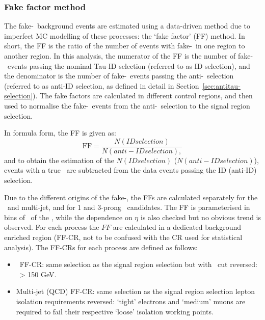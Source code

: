 \subsubsection{Fake factor method}
The fake-\tauhad\ background events
are estimated using a data-driven method due to imperfect MC modelling of these processes:
the `fake factor' (FF) method.
In short, the FF is the ratio of 
the number of events with fake-\tauhad\ in one region to another region.
In this analysis, 
the numerator of the FF is the number of fake-\tauhad\ events 
passing the nominal Tau-ID selection (referred to as ID selection), 
and the denominator is the number of fake-\tauhad\ events passing the
anti-\tauhad\ selection (referred to as anti-ID selection, 
as defined in detail in Section~\ref{sec:antitau-selection}). 
The fake factors are calculated in different control regions, and
then used to normalise the fake-\tauhad\ events from the 
anti-\tauhad\ selection to the signal region selection. 

In formula form, the FF is given as:
\begin{equation}
\mathrm{FF} =  \frac{N(ID selection)}{N(anti-ID selection),} 
\end{equation} 
and to obtain the estimation of the $N(ID selection)$ ($N(anti-ID selection)$),
events with a true \tauhad\ are subtracted from the data events
passing the ID (anti-ID) selection.

Due to the different origins of the fake-\tauhad, the FFs are
calculated separately for the \ttbar\ and multi-jet, 
and for 1 and 3-prong \tauhad\ candidates.
The FF is parameterised in bins of \pt\ of the \tauhad, while the 
dependence on $\eta$ is also checked but no obvious trend is observed.
For each process the $FF$ are calculated in 
a dedicated background enriched region (FF-CR,
not to be confused with the CR used for statistical analysis). 
The FF-CRs for each process are defined as follows:
\begin{itemize}
\item \ttbar\ FF-CR: same selection as the signal region selection 
but with \mbb\ cut reversed: \mbb\ > 150 GeV.
\item Multi-jet (QCD) FF-CR: same selection as the signal region selection lepton isolation requirements
 reversed: `tight' electrons and `medium' muons are required to fail 
 their respective `loose' isolation working points.
\end{itemize}

